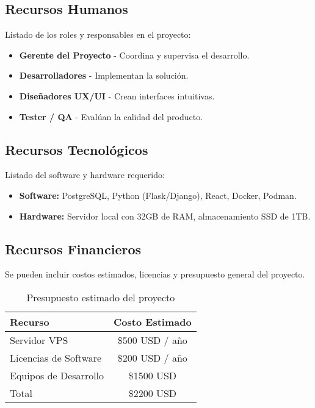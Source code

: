 \subsection{Recursos Humanos} Listado de los roles y responsables en el proyecto: \begin{itemize} \item \textbf{Gerente del Proyecto} - Coordina y supervisa el desarrollo. \item \textbf{Desarrolladores} - Implementan la solución. \item \textbf{Diseñadores UX/UI} - Crean interfaces intuitivas. \item \textbf{Tester / QA} - Evalúan la calidad del producto. \end{itemize}

\subsection{Recursos Tecnológicos} Listado del software y hardware requerido: \begin{itemize} \item \textbf{Software:} PostgreSQL, Python (Flask/Django), React, Docker, Podman. \item \textbf{Hardware:} Servidor local con 32GB de RAM, almacenamiento SSD de 1TB. \end{itemize}

\subsection{Recursos Financieros} Se pueden incluir costos estimados, licencias y presupuesto general del proyecto.

\begin{table}[h]
	\centering
	\begin{tabular}{|l|c|}
		\hline
		\textbf{Recurso} & \textbf{Costo Estimado} \\ \hline
		Servidor VPS & \$500 USD / año \\ \hline
		Licencias de Software & \$200 USD / año \\ \hline
		Equipos de Desarrollo & \$1500 USD \\ \hline
		Total & \$2200 USD \\ \hline
	\end{tabular}
	\caption{Presupuesto estimado del proyecto}
\end{table}
